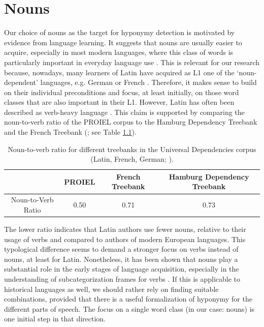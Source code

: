 \chapter{Nouns}
Our choice of nouns as the target for hyponymy detection is motivated by evidence from language learning. It suggests that nouns are usually easier to acquire, especially in most modern languages, where this class of words is particularly important in everyday language use \parencite[9]{garcia-gamezLearningNounsVerbs2019}. This is relevant for our research because, nowadays, many learners of Latin have acquired as L1 one of the `noun-dependent' languages, e.g. German or French \parencite[51-52]{baidakKeyDataTeaching2017}. Therefore, it makes sense to build on their individual preconditions and focus, at least initially, on those word classes that are also important in their L1. However, Latin has often been described as verb-heavy language \parencite[41]{mengeLehrbuchLateinischenSyntax2009}. This claim is supported by comparing the noun-to-verb ratio \parencite[300]{stollNounsVerbsChintang2012} of the PROIEL corpus to the Hamburg Dependency Treebank \parencite{borgesvolkerHDTUDVeryLarge2019} and the French Treebank (\cite{seddahCheatingParserDeath2018}; see Table \ref{tableNounToVerbRatio}).
\begin{table}[ht]
	\begin{tabular}{ c | c | c | c }
  		 & PROIEL & French Treebank & Hamburg Dependency Treebank \\ \hline
  		Noun-to-Verb Ratio & 0.50 & 0.71 & 0.73 \\
	\end{tabular}
	\caption{Noun-to-verb ratio for different treebanks in the Universal Dependencies corpus (Latin, French, German; \cite{nivreUniversalDependenciesV12016}).}
	\label{tableNounToVerbRatio}
\end{table}

The lower ratio indicates that Latin authors use fewer nouns, relative to their usage of verbs and compared to authors of modern European languages. This typological difference seems to demand a stronger focus on verbs instead of nouns, at least for Latin. Nonetheless, it has been shown that nouns play a substantial role in the early stages of language acquisition, especially in the understanding of subcategorization frames for verbs \parencite[1383]{yuanCountingNounsSimple2012}. If this is applicable to historical languages as well, we should rather rely on finding suitable combinations, provided that there is a useful formalization of hyponymy for the different parts of speech. The focus on a single word class (in our case: nouns) is one initial step in that direction.